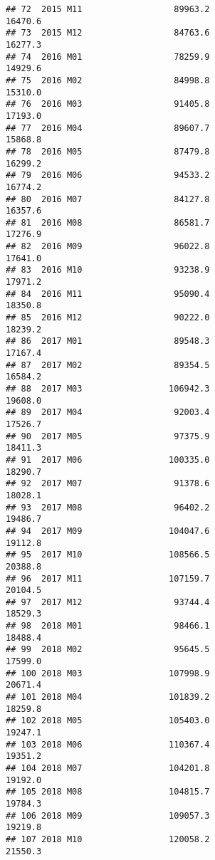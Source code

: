 \documentclass[
]{article}
\begin{document}
\begin{verbatim}
## 72  2015 M11                  89963.2                         16470.6
## 73  2015 M12                  84763.6                         16277.3
## 74  2016 M01                  78259.9                         14929.6
## 75  2016 M02                  84998.8                         15310.0
## 76  2016 M03                  91405.8                         17193.0
## 77  2016 M04                  89607.7                         15868.8
## 78  2016 M05                  87479.8                         16299.2
## 79  2016 M06                  94533.2                         16774.2
## 80  2016 M07                  84127.8                         16357.6
## 81  2016 M08                  86581.7                         17276.9
## 82  2016 M09                  96022.8                         17641.0
## 83  2016 M10                  93238.9                         17971.2
## 84  2016 M11                  95090.4                         18350.8
## 85  2016 M12                  90222.0                         18239.2
## 86  2017 M01                  89548.3                         17167.4
## 87  2017 M02                  89354.5                         16584.2
## 88  2017 M03                 106942.3                         19608.0
## 89  2017 M04                  92003.4                         17526.7
## 90  2017 M05                  97375.9                         18411.3
## 91  2017 M06                 100335.0                         18290.7
## 92  2017 M07                  91378.6                         18028.1
## 93  2017 M08                  96402.2                         19486.7
## 94  2017 M09                 104047.6                         19112.8
## 95  2017 M10                 108566.5                         20388.8
## 96  2017 M11                 107159.7                         20104.5
## 97  2017 M12                  93744.4                         18529.3
## 98  2018 M01                  98466.1                         18488.4
## 99  2018 M02                  95645.5                         17599.0
## 100 2018 M03                 107998.9                         20671.4
## 101 2018 M04                 101839.2                         18259.8
## 102 2018 M05                 105403.0                         19247.1
## 103 2018 M06                 110367.4                         19351.2
## 104 2018 M07                 104201.8                         19192.0
## 105 2018 M08                 104815.7                         19784.3
## 106 2018 M09                 109057.3                         19219.8
## 107 2018 M10                 120058.2                         21550.3

\end{verbatim}
\end{document}
